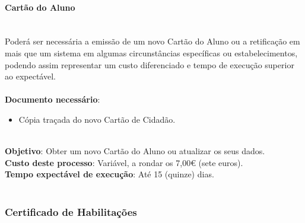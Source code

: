 \paragraph{Cartão do Aluno}
\leavevmode\\[4pt]
Poderá ser necessária a emissão de um novo Cartão do Aluno ou a
retificação em mais que um sistema em algumas circunstâncias específicas
ou estabelecimentos, podendo assim representar um custo diferenciado e
tempo de execução superior ao expectável. \\
\\
\textbf{Documento necessário}:
\begin{itemize}
	\item Cópia traçada do novo Cartão de Cidadão.
\end{itemize}
\leavevmode\\
\textbf{Objetivo}: Obter um novo Cartão do Aluno ou atualizar os seus dados. \\
\textbf{Custo deste processo}: Variável, a rondar os 7,00€ (sete euros). \\
\textbf{Tempo expectável de execução}: Até 15 (quinze) dias. \\
\\
\subsubsection{Certificado de Habilitações}

